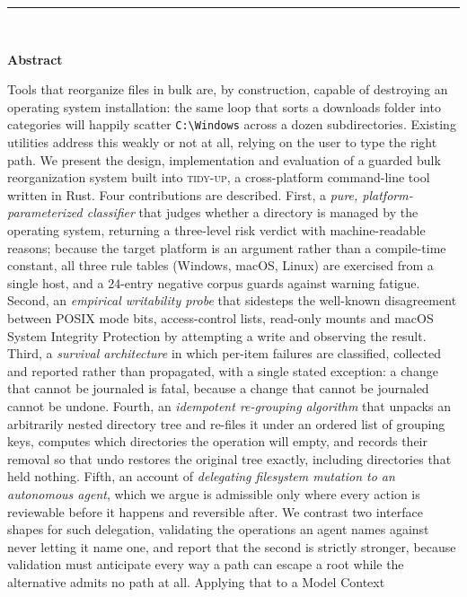 \documentclass[11pt,a4paper]{article}
\newcommand{\code}[1]{\texttt{\small #1}}
\newcommand{\tool}{\textsc{tidy-up}}
\begin{document}
\begin{center}
\begin{minipage}{0.86\textwidth}
\rule{\textwidth}{0.8pt}\\[0.5em]
{\centering\textbf{Abstract}\par}
\vspace{0.4em}
\small
Tools that reorganize files in bulk are, by construction, capable of destroying an
operating system installation: the same loop that sorts a downloads folder into
categories will happily scatter \code{C:\textbackslash Windows} across a dozen
subdirectories. Existing utilities address this weakly or not at all, relying on the
user to type the right path. We present the design, implementation and evaluation of
a guarded bulk reorganization system built into \tool{}, a cross-platform
command-line tool written in Rust. Four contributions are described. First, a
\emph{pure, platform-parameterized classifier} that judges whether a directory is
managed by the operating system, returning a three-level risk verdict with
machine-readable reasons; because the target platform is an argument rather than a
compile-time constant, all three rule tables (Windows, macOS, Linux) are exercised
from a single host, and a 24-entry negative corpus guards against warning fatigue.
Second, an \emph{empirical writability probe} that sidesteps the well-known
disagreement between POSIX mode bits, access-control lists, read-only mounts and
macOS System Integrity Protection by attempting a write and observing the result.
Third, a \emph{survival architecture} in which per-item failures are classified,
collected and reported rather than propagated, with a single stated exception: a
change that cannot be journaled is fatal, because a change that cannot be journaled
cannot be undone. Fourth, an \emph{idempotent re-grouping algorithm} that unpacks an
arbitrarily nested directory tree and re-files it under an ordered list of grouping
keys, computes which directories the operation will empty, and records their removal
so that undo restores the original tree exactly, including directories that held
nothing. Fifth, an account of \emph{delegating filesystem mutation to an
autonomous agent}, which we argue is admissible only where every action is
reviewable before it happens and reversible after. We contrast two interface
shapes for such delegation, validating the operations an agent names against
never letting it name one, and report that the second is strictly stronger,
because validation must anticipate every way a path can escape a root while
the alternative admits no path at all. Applying that to a Model Context

\end{minipage}
\end{center}
\end{document}
